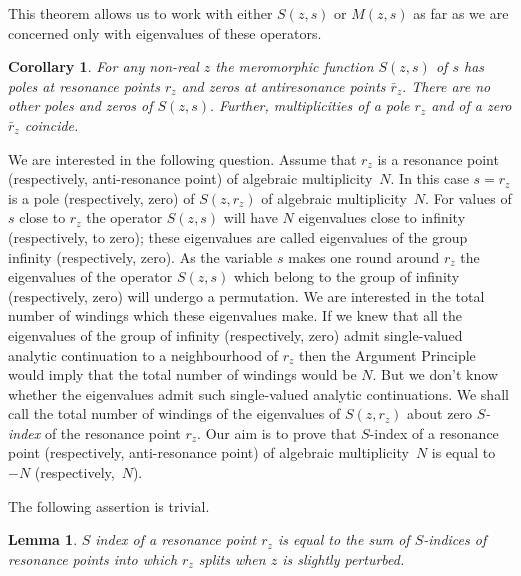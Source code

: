 \documentclass[11pt]{amsart}
\newtheorem{lemma}[thm]{Lemma}
\newtheorem{cor}[thm]{Corollary}
\numberwithin{equation}{section}
\begin{document}
This theorem allows us to work with either $S(z,s)$ or $M(z,s)$ as far as we are concerned only with eigenvalues of these operators.

\begin{cor} For any non-real $z$ the meromorphic function $S(z,s)$ of $s$ has poles at resonance points $r_z$
and zeros at antiresonance points $\bar r_z.$ There are no other poles and zeros of $S(z,s).$ Further, multiplicities of
a pole $r_z$ and of a zero $\bar r_z$ coincide.
\end{cor}

We are interested in the following question. Assume that $r_z$ is a resonance point (respectively, anti-resonance point)
of algebraic multiplicity~$N.$ In this case $s=r_z$ is a pole (respectively, zero) of $S(z,r_z)$ of algebraic multiplicity~$N.$
For values of $s$ close to $r_z$ the operator $S(z,s)$ will have $N$ eigenvalues close to infinity (respectively, to zero);
these eigenvalues are called eigenvalues of the group infinity (respectively, zero).
As the variable $s$ makes one round around $r_z$
the eigenvalues of the operator $S(z,s)$ which belong to the group of infinity (respectively, zero) will undergo a permutation. We are interested in the total number of windings
which these eigenvalues make. If we knew that all the eigenvalues of the group of infinity (respectively, zero) admit single-valued analytic continuation to a neighbourhood of $r_z$
then the Argument Principle would imply that the total number of windings would be $N.$ But we don't know whether the eigenvalues admit such single-valued
analytic continuations. We shall call the total number of windings of the eigenvalues of $S(z,r_z)$ about zero \emph{$S$-index} of the resonance point $r_z.$
Our aim is to prove that $S$-index of a resonance point (respectively, anti-resonance point) of
algebraic multiplicity~$N$ is equal to~$-N$ (respectively,~$N$).

The following assertion is trivial.
\begin{lemma} \label{L: S-index of a group}
$S$ index of a resonance point $r_z$ is equal to the sum of $S$-indices of resonance points into which $r_z$
splits when $z$ is slightly perturbed.
\end{lemma}
\end{document}
